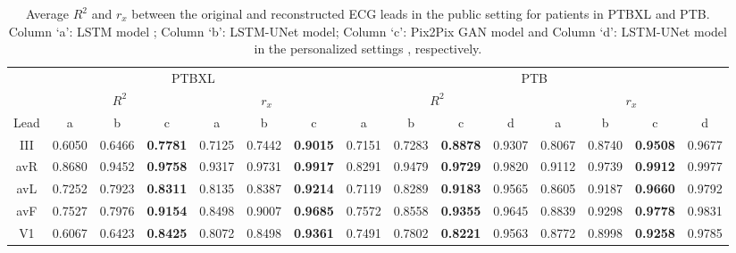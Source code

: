 



\begin{table}[t!]
\begin{center}
\begin{footnotesize}
\renewcommand{\arraystretch}{1.2}
\renewcommand{\tabcolsep}{6.5pt}

\caption{Average $R^2$ and $r_x$ between the original and reconstructed ECG leads in the public setting for patients in PTBXL and PTB. Column `a': LSTM model \cite{lstm}; Column `b': LSTM-UNet model; Column `c': Pix2Pix GAN model and Column `d': LSTM-UNet model in the personalized settings \cite{lstm-unet}, respectively.}

\begin{tabular}{|c|ccc|ccc|cccc|cccc|}
\hline
\cline{2-15}
& \multicolumn{6}{c|}{PTBXL} 
& \multicolumn{8}{c|}{PTB} \\

\cline{2-15}
& \multicolumn{3}{c|}{$R^2$}
& \multicolumn{3}{c|}{$r_x$} 
& \multicolumn{4}{c|}{$R^2$}
& \multicolumn{4}{c|}{$r_x$} 
\\
\cline{2-15}

Lead & a & b & c & a & b & c & a & b & c & d & a & b & c & d \\
\hline
III & 0.6050 & 0.6466 & \textbf{0.7781} &  0.7125 &  0.7442 & \textbf{0.9015} & 0.7151 & 0.7283 & \textbf{0.8878} & 0.9307 & 0.8067 & 0.8740 & \textbf{0.9508} & 0.9677   

  \\

avR & 0.8680 & 0.9452 & \textbf{0.9758} & 0.9317 & 0.9731 & \textbf{0.9917} & 0.8291 & 0.9479 & \textbf{0.9729} & 0.9820 & 0.9112 & 0.9739 & \textbf{0.9912} & 0.9977  

  \\

avL & 0.7252 & 0.7923 & \textbf{0.8311} & 0.8135 & 0.8387 & \textbf{0.9214} & 0.7119 & 0.8289 & \textbf{0.9183} & 0.9565 & 0.8605 & 0.9187 & \textbf{0.9660} & 0.9792   

  \\

avF & 0.7527 & 0.7976 & \textbf{0.9154} & 0.8498 & 0.9007 & \textbf{0.9685} & 0.7572 & 0.8558 & \textbf{0.9355} & 0.9645 & 0.8839 & 0.9298 & \textbf{0.9778} & 0.9831 

  \\

V1 & 0.6067 & 0.6423 & \textbf{0.8425} & 0.8072 & 0.8498 & \textbf{0.9361} & 0.7491 & 0.7802 & \textbf{0.8221} & 0.9563 & 0.8772 & 0.8998 & \textbf{0.9258} & 0.9785  


\end{tabular}
\end{footnotesize}
\end{center}
\end{table}
